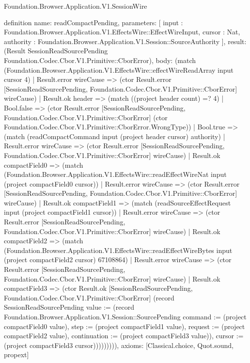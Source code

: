 \begin{lexlean}{Foundation.Browser.Application.V1.SessionWire}
\begin{semanticmodule}
definition{
  name: readCompactPending,
  parameters: [
    input : Foundation.Browser.Application.V1.EffectsWire::EffectWireInput,
    cursor : Nat,
    authority : Foundation.Browser.Application.V1.Session::SourceAuthority
  ],
  result: (Result SessionReadSourcePending Foundation.Codec.Cbor.V1.Primitive::CborError),
  body: (match (Foundation.Browser.Application.V1.EffectsWire::effectWireReadArray input cursor 4)
    | Result.error wireCause => (ctor Result.error [SessionReadSourcePending, Foundation.Codec.Cbor.V1.Primitive::CborError] wireCause)
    | Result.ok header => (match ((project header count) =? 4)
      | Bool.false => (ctor Result.error [SessionReadSourcePending, Foundation.Codec.Cbor.V1.Primitive::CborError] (ctor Foundation.Codec.Cbor.V1.Primitive::CborError.WrongType))
      | Bool.true => (match (readCompactCommand input (project header cursor) authority)
        | Result.error wireCause => (ctor Result.error [SessionReadSourcePending, Foundation.Codec.Cbor.V1.Primitive::CborError] wireCause)
        | Result.ok compactField0 => (match (Foundation.Browser.Application.V1.EffectsWire::readEffectWireNat input (project compactField0 cursor))
          | Result.error wireCause => (ctor Result.error [SessionReadSourcePending, Foundation.Codec.Cbor.V1.Primitive::CborError] wireCause)
          | Result.ok compactField1 => (match (readSourceEffectRequest input (project compactField1 cursor))
            | Result.error wireCause => (ctor Result.error [SessionReadSourcePending, Foundation.Codec.Cbor.V1.Primitive::CborError] wireCause)
            | Result.ok compactField2 => (match (Foundation.Browser.Application.V1.EffectsWire::readEffectWireBytes input (project compactField2 cursor) 67108864)
              | Result.error wireCause => (ctor Result.error [SessionReadSourcePending, Foundation.Codec.Cbor.V1.Primitive::CborError] wireCause)
              | Result.ok compactField3 => (ctor Result.ok [SessionReadSourcePending, Foundation.Codec.Cbor.V1.Primitive::CborError] (record SessionReadSourcePending {value := (record Foundation.Browser.Application.V1.Session::SourcePending {command := (project compactField0 value), step := (project compactField1 value), request := (project compactField2 value), continuation := (project compactField3 value)}), cursor := (project compactField3 cursor)})))))))),
  axioms: [Classical.choice, Quot.sound, propext]
}


\end{semanticmodule}
\end{lexlean}
